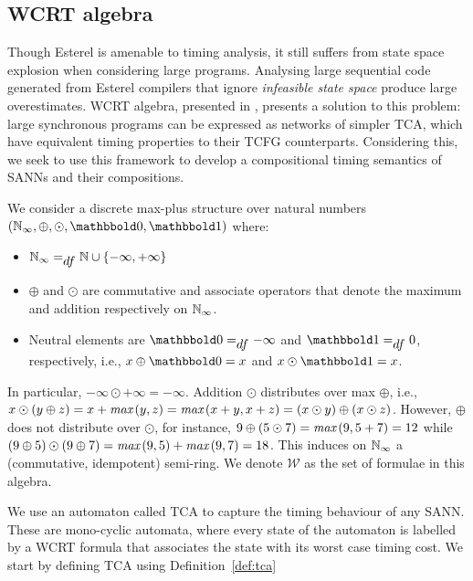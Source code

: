 \subsection{\ac{WCRT} algebra}
\label{sec:wcrt-algebra}

Though Esterel is amenable to timing analysis, it still suffers from state space explosion when considering large programs. 
Analysing large sequential code generated from Esterel compilers that ignore \emph{infeasible state space} 
produce large overestimates. \ac{WCRT} algebra, presented in \cite{wang2017timing}, presents a solution to this problem: large synchronous programs can be expressed as 
networks of simpler \ac{TCA}, which have equivalent timing properties to their \ac{TCFG} counterparts. Considering this, we
seek to use this framework to develop a compositional timing semantics of \acp{SANN} and their compositions.

We consider a discrete max-plus structure over
natural numbers $(\Nat_{\infty}, \oplus, \odot, \zero, \one)$ where:
\begin{itemize}
	\item ${\mathbb N}_{\infty} =_{\textstyle{df}} {\mathbb N} \cup \{ -\infty, +\infty \}$
	\item  $\oplus$ and $\odot$ are commutative and associate operators that 
	denote the maximum and addition respectively on ${\mathbb N}_{\infty}$. 
	\item Neutral elements are $\zero \dfs -\infty$ and $\one \dfs 0$,
	respectively, i.e., $x \oplus \zero = x$ and $x \odot \one = x$. 
\end{itemize}

In particular, $-\infty \odot +\infty = -\infty$. Addition
$\odot$ distributes over max $\oplus$, i.e.,
$x \odot \left(y \oplus z\right) = x + \textit{max}\left(y, z\right) = \textit{max}\left(x + y, x + z\right) =
\left(x \odot y\right) \oplus \left(x \odot z\right)$. However, $\oplus$ does not distribute
over $\odot$, for instance, $9 \oplus \left(5 \odot 7\right) = \textit{max}\left(9, 5 + 7\right) = 12$
while $\left(9 \oplus 5\right) \odot \left(9 \oplus 7\right) = \textit{max}\left(9, 5\right) + \textit{max}\left(9, 7\right) = 18$.
This induces on ${\mathbb N}_{\infty}$ a (commutative, idempotent) semi-ring.
We denote $\mathcal{W}$ as the set of formulae in this algebra.

We use an automaton called \ac{TCA} to capture the timing behaviour of any \ac{SANN}.
These are mono-cyclic automata, where every state of the automaton is labelled by a
WCRT formula that associates the state with its worst case timing cost.
We start by defining \ac{TCA} using Definition~\ref{def:tca}

